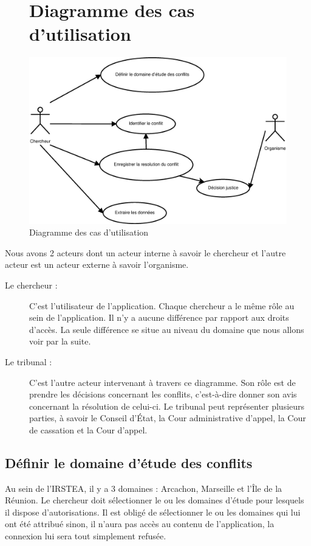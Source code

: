 \documentclass[12pt,a4paper]{article}
\begin{document}
\clearpage
\begin{figure}
\section{Diagramme des cas d'utilisation}
\vspace{0.5cm}
\centering
\includegraphics[scale=0.4]{Image/CU.eps}
\caption{Diagramme des cas d'utilisation}
\end{figure}

\vspace{1cm}
Nous avons 2 acteurs dont un acteur interne à savoir le chercheur et l'autre acteur est un acteur externe à savoir l'organisme. \newline
\begin{description}
\item[Le chercheur :]C'est l'utilisateur de l'application. Chaque chercheur a le même rôle au sein de l'application. Il n'y a aucune différence par rapport aux droits d'accès. La seule différence se situe au niveau du domaine que nous allons voir par la suite.
\item[Le tribunal :] C'est l'autre acteur intervenant à travers ce diagramme. Son rôle est de prendre les décisions concernant les conflits, c'est-à-dire donner son avis concernant la résolution de celui-ci. \newline
Le tribunal peut représenter plusieurs parties, à savoir le Conseil d'État, la Cour administrative d'appel, la Cour de cassation et la Cour d'appel.
\end{description}


\subsection{Définir le domaine d'étude des conflits}
Au sein de l'IRSTEA, il y a 3 domaines : Arcachon, Marseille et l'Île de la Réunion. 
Le chercheur doit sélectionner le ou les domaines d'étude pour lesquels il dispose d'autorisations. Il est obligé de sélectionner le ou les domaines qui lui ont été attribué sinon, il n'aura pas accès au contenu de l'application, la connexion lui sera tout simplement refusée. 
\end{document}
